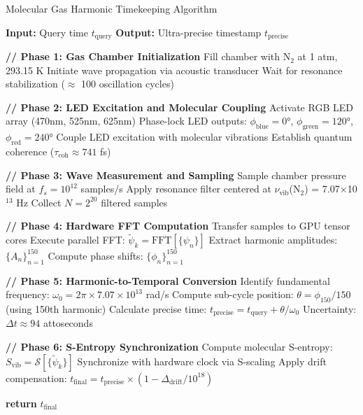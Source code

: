 \documentclass[12pt,a4paper]{article}
\begin{document}
\begin{algorithm}[H]
\caption{Molecular Gas Harmonic Timekeeping Algorithm}
\begin{algorithmic}[1]
\State \textbf{Input:} Query time $t_{\text{query}}$
\State \textbf{Output:} Ultra-precise timestamp $t_{\text{precise}}$

\State \textbf{// Phase 1: Gas Chamber Initialization}
\State Fill chamber with N$_2$ at 1 atm, 293.15 K
\State Initiate wave propagation via acoustic transducer
\State Wait for resonance stabilization ($\approx$ 100 oscillation cycles)

\State \textbf{// Phase 2: LED Excitation and Molecular Coupling}
\State Activate RGB LED array (470nm, 525nm, 625nm)
\State Phase-lock LED outputs: $\phi_{\text{blue}} = 0°$, $\phi_{\text{green}} = 120°$, $\phi_{\text{red}} = 240°$
\State Couple LED excitation with molecular vibrations
\State Establish quantum coherence ($\tau_{\text{coh}} \approx 741$ fs)

\State \textbf{// Phase 3: Wave Measurement and Sampling}
\State Sample chamber pressure field at $f_s = 10^{12}$ samples/s
\State Apply resonance filter centered at $\nu_{\text{vib}}$(N$_2$) = 7.07×10$^{13}$ Hz
\State Collect $N = 2^{20}$ filtered samples

\State \textbf{// Phase 4: Hardware FFT Computation}
\State Transfer samples to GPU tensor cores
\State Execute parallel FFT: $\tilde{\psi}_k = \text{FFT}[\{\psi_n\}]$
\State Extract harmonic amplitudes: $\{A_n\}_{n=1}^{150}$
\State Compute phase shifts: $\{\phi_n\}_{n=1}^{150}$

\State \textbf{// Phase 5: Harmonic-to-Temporal Conversion}
\State Identify fundamental frequency: $\omega_0 = 2\pi \times 7.07 \times 10^{13}$ rad/s
\State Compute sub-cycle position: $\theta = \phi_{150}/150$ (using 150th harmonic)
\State Calculate precise time: $t_{\text{precise}} = t_{\text{query}} + \theta/\omega_0$
\State Uncertainty: $\Delta t \approx 94$ attoseconds

\State \textbf{// Phase 6: S-Entropy Synchronization}
\State Compute molecular S-entropy: $S_{\text{vib}} = \mathcal{S}[\{\tilde{\psi}_k\}]$
\State Synchronize with hardware clock via S-scaling
\State Apply drift compensation: $t_{\text{final}} = t_{\text{precise}} \times (1 - \Delta_{\text{drift}}/10^{18})$

\State \textbf{return} $t_{\text{final}}$
\end{algorithmic}
\end{algorithm}
\end{document}
